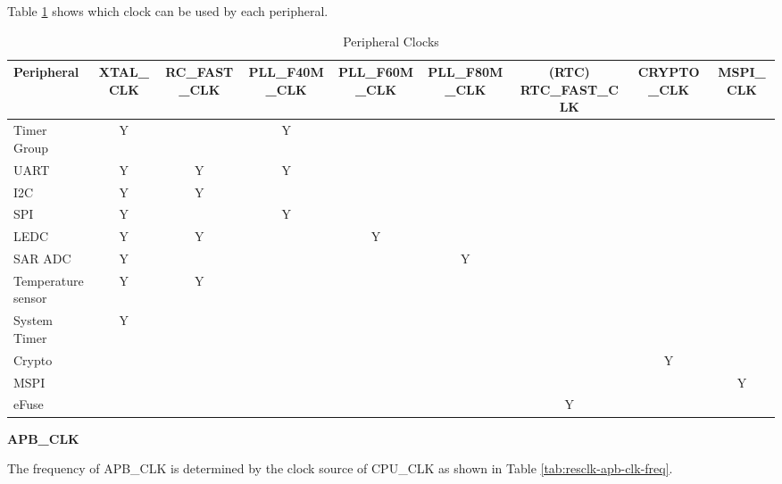 \documentclass[main\_\_EN.tex]{subfiles}
\begin{document}
Table \ref{tab:resclk-periph-clks} shows which clock can be used by each peripheral.


\begin{landscape}
\begin{longtable}[c]{|p{2.5cm}|c|c|c|c|c|c|c|c| }
 \caption{Peripheral Clocks}
    \label{tab:resclk-periph-clks} \\
  \hline
    \rowcolor{lightgray}

        \textbf{Peripheral} & \textbf{XTAL\_CLK} & \textbf{RC\_FAST\_CLK} & \textbf{PLL\_F40M\_CLK} & \textbf{PLL\_F60M\_CLK} & \textbf{PLL\_F80M\_CLK} & \textbf{(RTC) RTC\_FAST\_CLK} & \textbf{CRYPTO\_CLK} & \textbf{MSPI\_CLK} \\\hline
        Timer Group       & Y &   & Y &   &   &   &   &   \\
        \hline
        UART       & Y & Y & Y &   &   &   &   &   \\
        \hline
        I2C        & Y & Y &   &   &   &   &   &   \\
        \hline
        SPI        & Y &   & Y &   &   &   &   &   \\
        \hline
        LEDC       & Y & Y &   & Y &   &   &   &   \\
        \hline
        SAR ADC     & Y &   &   &   & Y &   &   &   \\
        \hline
        Temperature sensor    & Y & Y &   &   &   &   &   &   \\
        \hline
        System Timer & Y &   &   &   &   &   &   &   \\
        \hline
        Crypto     &   &   &   &   &   &   & Y &   \\
        \hline
        MSPI       &   &   &   &   &   &   &   & Y \\
        \hline
        eFuse      &   &   &   &   &   & Y &   &   \\
        \hline
\end{longtable}
\end{landscape}

\textbf{APB\_CLK}

The frequency of APB\_CLK is determined by the clock source of CPU\_CLK as shown in Table \ref{tab:resclk-apb-clk-freq}.
\end{document}
